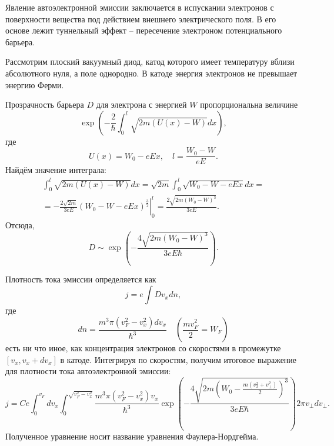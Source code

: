 Явление автоэлектронной эмиссии заключается в испускании электронов с
поверхности вещества под действием внешнего электрического поля. В его основе
лежит туннельный эффект -- пересечение электроном потенциального барьера.

Рассмотрим плоский вакуумный диод, катод которого имеет температуру вблизи
абсолютного нуля, а поле однородно. В катоде энергия электронов не
превышает энергию Ферми.


Прозрачность барьера \( D \) для электрона с энергией \( W \) пропорциональна
величине
\[
    \exp\left(-\frac{2}{\hbar}\int_0^l\sqrt{2m(U(x)-W)}dx\right),
\]
где
\[
    U(x) = W_0 - eEx,\quad l = \frac{W_0-W}{eE}.
\]
Найдём значение интеграла:
\begin{gather*}
    \int_0^l\sqrt{2m(U(x)-W)}dx = \sqrt{2m}\int_0^l\sqrt{W_0-W-eEx}dx =\\
    =-\frac{2\sqrt{2m}}{3eE}\left.(W_0-W-eEx)^\frac{3}{2}\right|_0^l =
    \frac{2\sqrt{2m(W_0-W)^3}}{3eE}.
\end{gather*}
Отсюда,
\[
    D\sim\exp\left(-\frac{4\sqrt{2m(W_0-W)^3}}{3eE\hbar}\right).
\]

Плотность тока эмиссии определяется как
\[
    j = e\int Dv_xdn,
\]
где
\[
    dn = \frac{m^3\pi(v_F^2-v_x^2)dv_x}{\hbar^3}
    \quad \left(\frac{mv_F^2}{2} = W_F\right)
\]
есть ни что иное, как концентрация электронов со скоростями в промежутке
\( [v_x, v_x+dv_x] \) в катоде. Интегрируя по скоростям, получим итоговое
выражение для плотности тока автоэлектронной эмиссии:
\[
    j = C e \int_0^{v_F}dv_x\int_0^{\sqrt{v_F^2-v_x^2}}
    \frac{m^3\pi(v_F^2-v_x^2)v_x}{\hbar^3}
    \exp\left(
        -\frac{4\sqrt{2m\left(W_0-\frac{m(v_x^2+v_\perp^2)}{2}\right)^3}}
              {3eE\hbar}
    \right)
    2\pi v_\perp dv_\perp.
\]
Полученное уравнение носит название уравнения Фаулера-Нордгейма.

